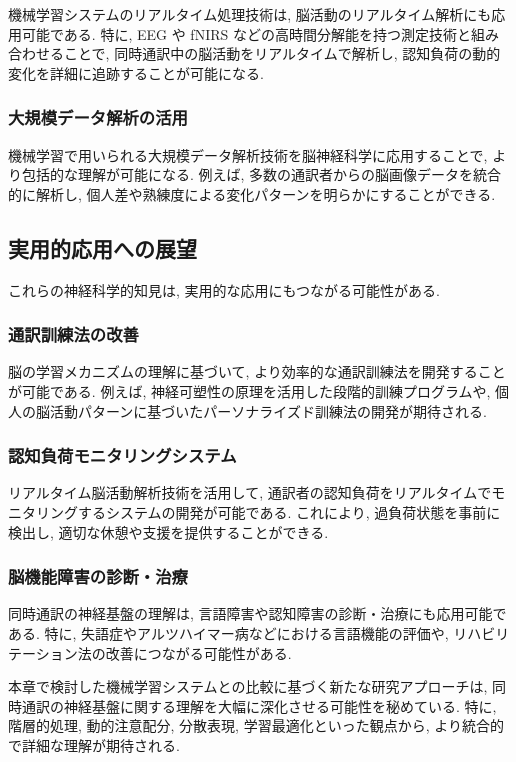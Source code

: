 機械学習システムのリアルタイム処理技術は, 脳活動のリアルタイム解析にも応用可能である.
特に, EEG や fNIRS などの高時間分解能を持つ測定技術と組み合わせることで, 同時通訳中の脳活動をリアルタイムで解析し, 認知負荷の動的変化を詳細に追跡することが可能になる.

\subsubsection{大規模データ解析の活用}

機械学習で用いられる大規模データ解析技術を脳神経科学に応用することで, より包括的な理解が可能になる.
例えば, 多数の通訳者からの脳画像データを統合的に解析し, 個人差や熟練度による変化パターンを明らかにすることができる.

\subsection{実用的応用への展望}

これらの神経科学的知見は, 実用的な応用にもつながる可能性がある.

\subsubsection{通訳訓練法の改善}

脳の学習メカニズムの理解に基づいて, より効率的な通訳訓練法を開発することが可能である.
例えば, 神経可塑性の原理を活用した段階的訓練プログラムや, 個人の脳活動パターンに基づいたパーソナライズド訓練法の開発が期待される.

\subsubsection{認知負荷モニタリングシステム}

リアルタイム脳活動解析技術を活用して, 通訳者の認知負荷をリアルタイムでモニタリングするシステムの開発が可能である.
これにより, 過負荷状態を事前に検出し, 適切な休憩や支援を提供することができる.

\subsubsection{脳機能障害の診断・治療}

同時通訳の神経基盤の理解は, 言語障害や認知障害の診断・治療にも応用可能である.
特に, 失語症やアルツハイマー病などにおける言語機能の評価や, リハビリテーション法の改善につながる可能性がある.

本章で検討した機械学習システムとの比較に基づく新たな研究アプローチは, 同時通訳の神経基盤に関する理解を大幅に深化させる可能性を秘めている.
特に, 階層的処理, 動的注意配分, 分散表現, 学習最適化といった観点から, より統合的で詳細な理解が期待される.